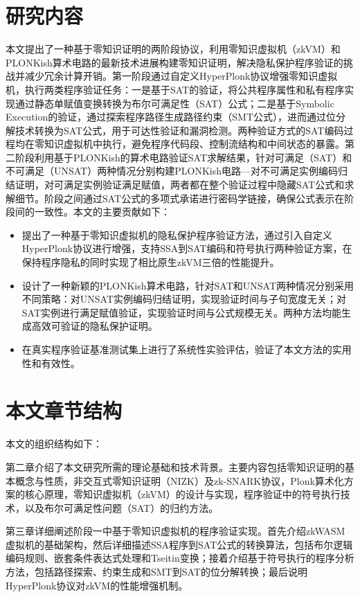 \section{研究内容}

本文提出了一种基于零知识证明的两阶段协议，利用零知识虚拟机（zkVM）和PLONKish算术电路的最新技术进展构建零知识证明，解决隐私保护程序验证的挑战并减少冗余计算开销。第一阶段通过自定义HyperPlonk协议增强零知识虚拟机，执行两类程序验证任务：一是基于SAT的验证，将公共程序属性和私有程序实现通过静态单赋值变换转换为布尔可满足性（SAT）公式；二是基于Symbolic Execution的验证，通过探索程序路径生成路径约束（SMT公式），进而通过位分解技术转换为SAT公式，用于可达性验证和漏洞检测。两种验证方式的SAT编码过程均在零知识虚拟机中执行，避免程序代码段、控制流结构和中间状态的暴露。第二阶段利用基于PLONKish的算术电路验证SAT求解结果，针对可满足（SAT）和不可满足（UNSAT）两种情况分别构建PLONKish电路—对不可满足实例编码归结证明，对可满足实例验证满足赋值，两者都在整个验证过程中隐藏SAT公式和求解细节。阶段之间通过SAT公式的多项式承诺进行密码学链接，确保公式表示在阶段间的一致性。本文的主要贡献如下：
\begin{itemize}
    \item 提出了一种基于零知识虚拟机的隐私保护程序验证方法，通过引入自定义HyperPlonk协议进行增强，支持SSA到SAT编码和符号执行两种验证方案，在保持程序隐私的同时实现了相比原生zkVM三倍的性能提升。
    \item 设计了一种新颖的PLONKish算术电路，针对SAT和UNSAT两种情况分别采用不同策略：对UNSAT实例编码归结证明，实现验证时间与子句宽度无关；对SAT实例进行满足赋值验证，实现验证时间与公式规模无关。两种方法均能生成高效可验证的隐私保护证明。
    \item 在真实程序验证基准测试集上进行了系统性实验评估，验证了本文方法的实用性和有效性。
\end{itemize}



\section{本文章节结构}
本文的组织结构如下：

第二章介绍了本文研究所需的理论基础和技术背景。主要内容包括零知识证明的基本概念与性质，非交互式零知识证明（NIZK）及zk-SNARK协议，Plonk算术化方案的核心原理，零知识虚拟机（zkVM）的设计与实现，程序验证中的符号执行技术，以及布尔可满足性问题（SAT）的归约方法。

第三章详细阐述阶段一中基于零知识虚拟机的程序验证实现。首先介绍zkWASM虚拟机的基础架构，然后详细描述SSA程序到SAT公式的转换算法，包括布尔逻辑编码规则、嵌套条件表达式处理和Tseitin变换；接着介绍基于符号执行的程序分析方法，包括路径探索、约束生成和SMT到SAT的位分解转换；最后说明HyperPlonk协议对zkVM的性能增强机制。

